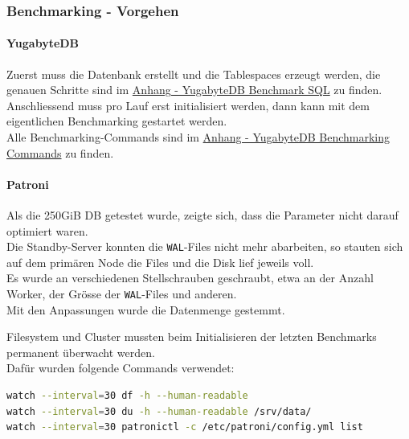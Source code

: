 
\begin{flushleft}
    \subsubsection{Benchmarking - Vorgehen}
    \paragraph{YugabyteDB}
    Zuerst muss die Datenbank erstellt und die Tablespaces erzeugt werden, die genauen Schritte sind im \hyperref[subsubsec:yugabytedb_benchmarking_sql]{Anhang - YugabyteDB Benchmark SQL} zu finden.\\
    Anschliessend muss pro Lauf erst initialisiert werden, dann kann mit dem eigentlichen Benchmarking gestartet werden.\\
    Alle Benchmarking-Commands sind im \hyperref[subsec:yugabytedb_benchmarking_commands]{Anhang - YugabyteDB Benchmarking Commands} zu finden.
    \paragraph{Patroni}
    Als die 250GiB DB getestet wurde, zeigte sich, dass die Parameter nicht darauf optimiert waren.\\
    Die Standby-Server konnten die \texttt{WAL}-Files nicht mehr abarbeiten, so stauten sich auf dem primären Node die Files und die Disk lief jeweils voll.\\
    Es wurde an verschiedenen Stellschrauben geschraubt, etwa an der Anzahl Worker, der Grösse der \texttt{WAL}-Files und anderen.\\
    Mit den Anpassungen wurde die Datenmenge gestemmt.
\end{flushleft}
\begin{flushleft}
    Filesystem und Cluster mussten beim Initialisieren der letzten Benchmarks permanent überwacht werden.\\
    Dafür wurden folgende Commands verwendet:
\lstset{style=gra_codestyle}
\begin{lstlisting}[language=bash, caption=Patroni - Benchmarking - Monitoring,captionpos=b,label={lst:benchmarking_patroni_monitoring},breaklines=true]
watch --interval=30 df -h --human-readable
watch --interval=30 du -h --human-readable /srv/data/
watch --interval=30 patronictl -c /etc/patroni/config.yml list
\end{lstlisting}
\end{flushleft}
